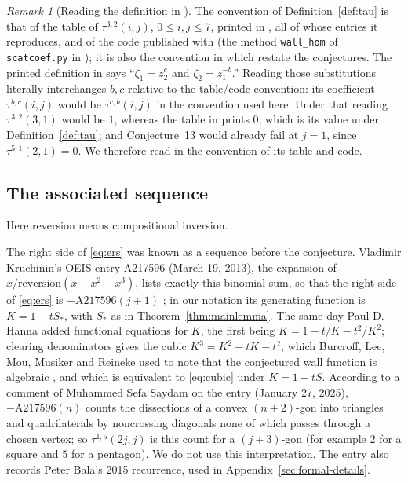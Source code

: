 \documentclass[11pt]{article}
\theoremstyle{definition}
\theoremstyle{remark}
\newtheorem{remark}[theorem]{Remark}
\numberwithin{equation}{section}
\newcommand{\Sst}{S_{*}}
\begin{document}
\begin{appendices}
\begin{remark}[Reading the definition in \cite{ERS}]\label{rem:reading}
The convention of Definition~\ref{def:tau} is that of the table of
$\tau^{3,2}(i,j)$, $0\leq i,j\leq7$, printed in \cite[\S2]{ERS}, all of whose entries it reproduces, and of the
code published with \cite{ERS}
(the method \texttt{wall\_hom} of \texttt{scatcoef.py} in \cite{scatcoef});
it is also the convention in which \cite{BLMMR} restate the conjectures.
The printed definition in \cite[\S2]{ERS} says
``$\zeta_1=z_2^c$ and $\zeta_2=z_1^{-b}$.''
Reading those substitutions literally interchanges $b,c$ relative to the
table/code convention: its coefficient $\tau^{b,c}(i,j)$ would be
$\tau^{c,b}(i,j)$ in the convention used here. Under that
reading $\tau^{3,2}(3,1)$ would be $1$, whereas the table in \cite{ERS}
prints $0$, which is its value under Definition~\ref{def:tau}; and
Conjecture~13 would already fail at $j=1$, since $\tau^{5,1}(2,1)=0$. We
therefore read \cite{ERS} in the convention of its table and code.
\end{remark}

\subsection{The associated sequence}\label{rem:sequence}
Here reversion means compositional inversion.

The right side of \eqref{eq:ers} was known as a sequence before the
conjecture. Vladimir Kruchinin's OEIS entry A217596 (March 19, 2013), the
expansion of $x/\mathrm{reversion}(x-x^2-x^3)$, lists exactly this
binomial sum, so that the right side of \eqref{eq:ers} is
$-\mathrm{A217596}(j+1)$ \cite{OEIS}; in our notation its generating
function is $K=1-t\Sst$, with $\Sst$ as in Theorem~\ref{thm:mainlemma}.
The same day Paul D. Hanna added functional equations for $K$, the first
being $K=1-t/K-t^2/K^2$; clearing denominators gives the cubic
$K^3=K^2-tK-t^2$, which Burcroff, Lee, Mou, Musiker and Reineke used to
note that the conjectured wall function is algebraic
\cite[\S9.3]{BLMMR}, and which is equivalent to \eqref{eq:cubic} under
$K=1-tS$. According to a comment of Muhammed
Sefa Saydam on the entry (January 27, 2025), $-\mathrm{A217596}(n)$ counts
the dissections of a convex $(n+2)$-gon into triangles and
quadrilaterals by noncrossing diagonals none of which passes through a
chosen vertex; so $\tau^{1,5}(2j,j)$ is this count for a $(j+3)$-gon
(for example $2$ for a square and $5$ for a pentagon). We do not use
this interpretation. The entry also records Peter Bala's 2015 recurrence,
used in Appendix~\ref{sec:formal-details}.

\end{appendices}
\end{document}
